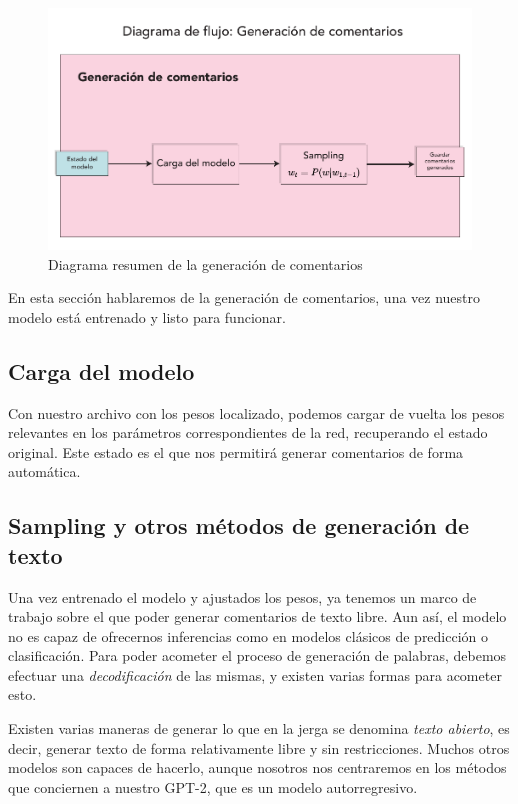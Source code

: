 \begin{figure}[h]
	\centering
	\includegraphics[width=.9\textwidth]{media/comment-gen.pdf}
	\caption{Diagrama resumen de la generación de comentarios}
	\label{fig:comment-gen}
\end{figure}

En esta sección hablaremos de la generación de comentarios, una vez nuestro modelo está entrenado y listo para funcionar. 

\subsection{Carga del modelo}
Con nuestro archivo con los pesos localizado, podemos cargar de vuelta los pesos relevantes en los parámetros correspondientes de la red, recuperando el estado original. Este estado es el que nos permitirá generar comentarios de forma automática.

\subsection{Sampling y otros métodos de generación de texto}
Una vez entrenado el modelo y ajustados los pesos, ya tenemos un marco de trabajo sobre el que poder generar comentarios de texto libre. Aun así, el modelo no es capaz de ofrecernos inferencias como en modelos clásicos de predicción o clasificación. Para poder acometer el proceso de generación de palabras, debemos efectuar una \textit{decodificación} de las mismas, y existen varias formas para acometer esto. 


Existen varias maneras de generar lo que en la jerga se denomina \textit{texto abierto}, es decir, generar texto de forma relativamente libre y sin restricciones. Muchos otros modelos son capaces de hacerlo, aunque nosotros nos centraremos en los métodos que conciernen a nuestro GPT-2, que es un modelo autorregresivo.

